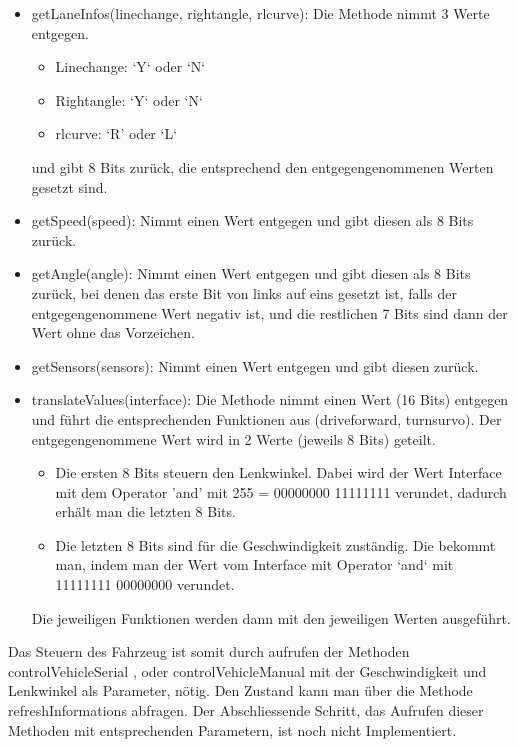         \begin{itemize}
            \item getLaneInfos(linechange, rightangle, rlcurve):
            Die Methode nimmt 3 Werte entgegen.
            \begin{itemize}
                \item Linechange: ‘Y‘ oder ‘N‘
                \item Rightangle: ‘Y‘ oder ‘N‘
                \item rlcurve: ‘R’ oder ‘L‘
            \end{itemize}
            
            und gibt 8 Bits zurück, die entsprechend den entgegengenommenen Werten gesetzt sind.
            \item getSpeed(speed):
            Nimmt einen Wert entgegen und gibt diesen als 8 Bits zurück.
            \item getAngle(angle):
            Nimmt einen Wert entgegen und gibt diesen als 8 Bits zurück, bei denen das erste Bit von links auf eins gesetzt ist, falls der entgegengenommene Wert negativ ist, und die restlichen 7 Bits sind dann der Wert ohne das Vorzeichen.
            \item getSensors(sensors):
            Nimmt einen Wert entgegen und gibt diesen zurück.
            \item translateValues(interface):
            Die Methode nimmt einen Wert (16 Bits) entgegen und führt die entsprechenden Funktionen aus (driveforward, turnsurvo).
            Der entgegengenommene Wert wird in 2 Werte (jeweils 8 Bits) geteilt. 
            \begin{itemize}
                \item Die ersten 8 Bits steuern den Lenkwinkel. Dabei wird der Wert Interface mit dem Operator 'and' mit  255 = 00000000 11111111 verundet, dadurch erhält man die letzten 8 Bits.
                \item Die letzten 8 Bits sind für die Geschwindigkeit zuständig. Die bekommt man, indem man der Wert vom Interface mit Operator ‘and‘ mit 11111111 00000000 verundet.
            \end{itemize}
            Die jeweiligen Funktionen werden dann mit den jeweiligen Werten ausgeführt.
        \end{itemize}
    
    	Das Steuern des Fahrzeug ist somit durch aufrufen der Methoden controlVehicleSerial , oder controlVehicleManual mit der Geschwindigkeit und Lenkwinkel als Parameter, nötig. Den Zustand kann man über die Methode refreshInformations abfragen. Der Abschliessende Schritt, das Aufrufen dieser Methoden mit entsprechenden Parametern, ist noch nicht Implementiert.
    	
